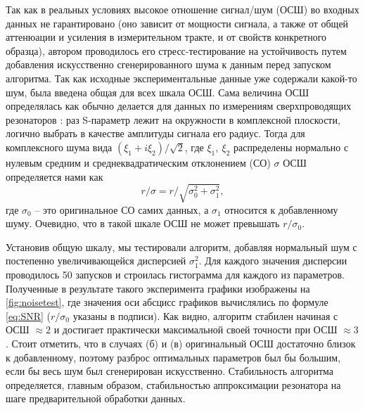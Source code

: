 \documentclass[14pt, a4paper]{extreport}
\numberwithin{equation}{section}
\begin{document}
Так как в реальных условиях высокое отношение сигнал/шум (ОСШ) во входных данных не гарантировано (оно зависит от мощности сигнала, а также от общей аттенюации и усиления в измерительном тракте, и от свойств конкретного образца), автором проводилось его стресс-тестирование на устойчивость путем добавления искусственно сгенерированного шума к данным перед запуском алгоритма. Так как исходные экспериментальные данные уже содержали какой-то шум, была введена общая для всех шкала ОСШ. Сама величина ОСШ определялась как обычно делается для данных по измерениям сверхпроводящих резонаторов \cite{probst2015efficient}: раз S-параметр лежит на окружности в комплексной плоскости, логично выбрать в качестве амплитуды сигнала его радиус. Тогда для комплексного шума вида $(\xi_1 + i\xi_2)/\sqrt{2}$, где $\xi_1,\ \xi_2$ распределены нормально с нулевым средним и среднеквадратическим отклонением (СО) $\sigma$ ОСШ определяется нами как
\begin{equation}
r/\sigma = r/\sqrt{\sigma_0^2+\sigma_1^2},
\label{eq:SNR}
\end{equation}
где $\sigma_0$ -- это оригинальное СО самих данных, а $\sigma_1$ относится к добавленному шуму. Очевидно, что в такой шкале ОСШ не может превышать $r/\sigma_0$.

Установив общую шкалу, мы тестировали алгоритм, добавляя нормальный шум с постепенно увеличивающейся дисперсией $\sigma_1^2$. Для каждого значения дисперсии проводилось 50 запусков и строилась гистограмма для каждого из параметров. Полученные в результате такого эксперимента графики изображены на \autoref{fig:noisetest}, где значения оси абсцисс графиков вычислялись по формуле \eqref{eq:SNR} ($r/\sigma_0$ указаны в подписи). Как видно, алгоритм стабилен начиная с ОСШ $\approx 2$ и достигает практически максимальной своей точности при ОСШ $\approx 3$. Стоит отметить, что в случаях (б) и (в) оригинальный ОСШ достаточно близок к добавленному, поэтому разброс оптимальных параметров был бы большим, если бы весь шум был сгенерирован искусственно. Стабильность алгоритма определяется, главным образом, стабильностью аппроксимации резонатора на шаге предварительной обработки данных.
\end{document}
